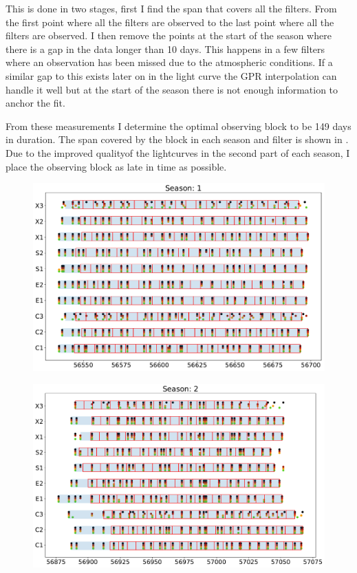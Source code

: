 This is done in two stages, first I find the span that covers all the filters. From the first point where all the filters are observed to the last point where all the filters are observed. I then remove the points at the start of the season where there is a gap in the data longer than 10 days. This happens in a few filters where an observation has been missed due to the atmospheric conditions. If a similar gap to this exists later on in the light curve the GPR interpolation can handle it well but at the start of the season there is not enough information to anchor the fit.

From these measurements I determine the optimal observing block to be 149 days in duration. The span covered by the block in each season and filter is shown in . Due to the improved qualityof the lightcurves in the second part of each season, I place the observing block as late in time as possible.

\begin{figure}[h]
  \includegraphics[width=\textwidth]{Figures/Chapter5/ObsBlock_Season1.pdf}
  \caption{}
  \label{fig:ObsBlock1}
\end{figure}

\begin{figure}[h]
  \includegraphics[width=\textwidth]{Figures/Chapter5/ObsBlock_Season2.pdf}
  \caption{}
  \label{fig:ObsBlock2}
\end{figure}

